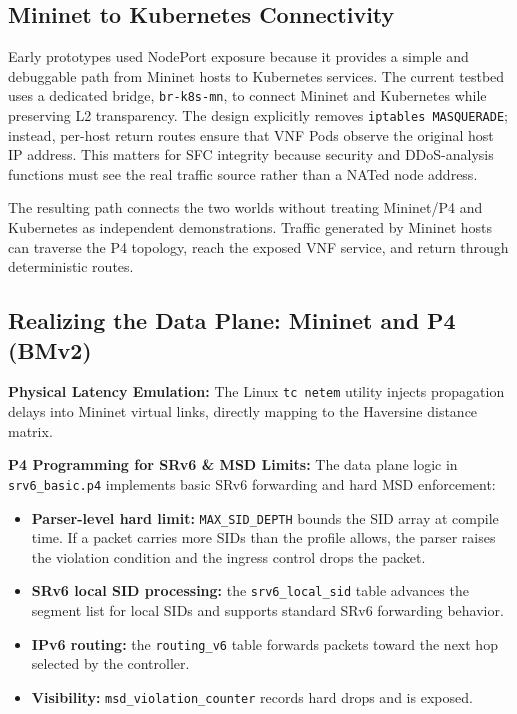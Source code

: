 \documentclass[12pt, a4paper, reqno, oneside]{book}
\begin{document}
\subsection{Mininet to Kubernetes Connectivity}
Early prototypes used NodePort exposure because it provides a simple and debuggable path from Mininet hosts to Kubernetes services. The current testbed uses a dedicated bridge, \texttt{br-k8s-mn}, to connect Mininet and Kubernetes while preserving L2 transparency. The design explicitly removes \texttt{iptables MASQUERADE}; instead, per-host return routes ensure that VNF Pods observe the original host IP address. This matters for SFC integrity because security and DDoS-analysis functions must see the real traffic source rather than a NATed node address.

The resulting path connects the two worlds without treating Mininet/P4 and Kubernetes as independent demonstrations. Traffic generated by Mininet hosts can traverse the P4 topology, reach the exposed VNF service, and return through deterministic routes.

\subsection{Realizing the Data Plane: Mininet and P4 (BMv2)}

\textbf{Physical Latency Emulation:} The Linux \texttt{tc netem} utility injects propagation delays into Mininet virtual links, directly mapping to the Haversine distance matrix.

\textbf{P4 Programming for SRv6 \& MSD Limits:} The data plane logic in \texttt{srv6\_basic.p4} \cite{stockmayer2020p4sfc} implements basic SRv6 forwarding and hard MSD enforcement:
\begin{itemize}
    \item \textbf{Parser-level hard limit:} \texttt{MAX\_SID\_DEPTH} bounds the SID array at compile time. If a packet carries more SIDs than the profile allows, the parser raises the violation condition and the ingress control drops the packet.
    \item \textbf{SRv6 local SID processing:} the \texttt{srv6\_local\_sid} table advances the segment list for local SIDs and supports standard SRv6 forwarding behavior.
    \item \textbf{IPv6 routing:} the \texttt{routing\_v6} table forwards packets toward the next hop selected by the controller.
    \item \textbf{Visibility:} \texttt{msd\_violation\_counter} records hard drops and is exposed.
\end{itemize}
\end{document}

